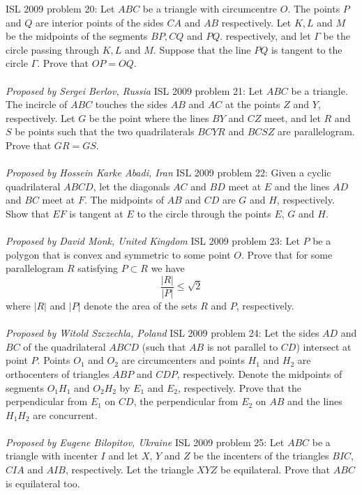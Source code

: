 ISL 2009 problem 20:  Let $ ABC$ be a triangle with circumcentre $ O$. The points $ P$ and $ Q$ are interior points of the sides $ CA$ and $ AB$ respectively. Let $ K,L$ and $ M$ be the midpoints of the segments $ BP,CQ$ and $ PQ$. respectively, and let $ \Gamma$ be the circle passing through $ K,L$ and $ M$. Suppose that the line $ PQ$ is tangent to the circle $ \Gamma$. Prove that $ OP = OQ.$ \\\\
\textit{Proposed by Sergei Berlov, Russia } 
ISL 2009 problem 21:  Let $ABC$ be a triangle. The incircle of $ABC$ touches the sides $AB$ and $AC$ at the points $Z$ and $Y$, respectively. Let $G$ be the point where the lines $BY$ and $CZ$ meet, and let $R$ and $S$ be points such that the two quadrilaterals $BCYR$ and $BCSZ$ are parallelogram. \\
Prove that $GR=GS$. \\\\
\textit{Proposed by Hossein Karke Abadi, Iran} 
ISL 2009 problem 22:  Given a cyclic quadrilateral $ABCD$, let the diagonals $AC$ and $BD$ meet at $E$ and the lines $AD$ and $BC$ meet at $F$. The midpoints of $AB$ and $CD$ are $G$ and $H$, respectively. Show that $EF$ is tangent at $E$ to the circle through the points $E$, $G$ and $H$. \\\\
\textit{Proposed by David Monk, United Kingdom} 
ISL 2009 problem 23:  Let $P$ be a polygon that is convex and symmetric to some point $O$. Prove that for some parallelogram $R$ satisfying $P\subset R$ we have
\[ \frac{|R|}{|P|}\leq \sqrt 2 \]
where $|R|$ and $|P|$ denote the area of the sets $R$ and $P$, respectively. \\\\
\textit{Proposed by Witold Szczechla, Poland} 
ISL 2009 problem 24:  Let the sides $AD$ and $BC$ of the quadrilateral $ABCD$ (such that $AB$ is not parallel to $CD$) intersect at point $P$. Points $O_1$ and $O_2$ are circumcenters and points $H_1$ and $H_2$ are orthocenters of triangles $ABP$ and $CDP$, respectively. Denote the midpoints of segments $O_1H_1$ and $O_2H_2$ by $E_1$ and $E_2$, respectively. Prove that the perpendicular from $E_1$ on $CD$, the perpendicular from $E_2$ on $AB$ and the lines $H_1H_2$ are concurrent. \\\\
\textit{Proposed by Eugene Bilopitov, Ukraine} 
ISL 2009 problem 25:  Let $ABC$ be a triangle with incenter $I$ and let $X$, $Y$ and $Z$ be the incenters of the triangles $BIC$, $CIA$ and $AIB$, respectively. Let the triangle $XYZ$ be equilateral. Prove that $ABC$ is equilateral too. \\\\
